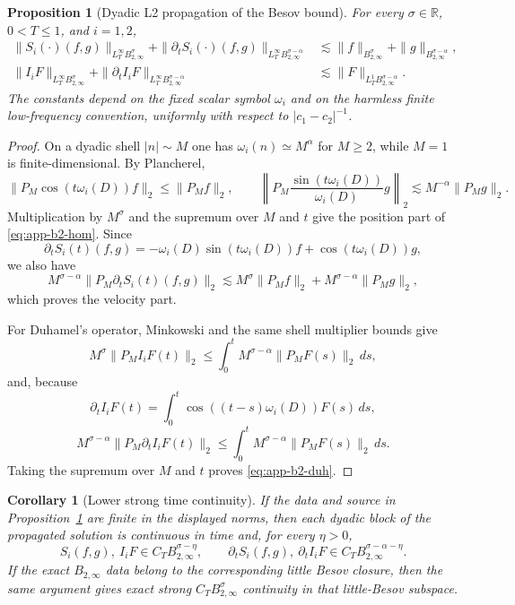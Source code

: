 \documentclass[10pt]{amsart}
\numberwithin{equation}{section}
\theoremstyle{plain}
\newtheorem{proposition}[theorem]{Proposition}
\newtheorem{corollary}[theorem]{Corollary}
\theoremstyle{definition}
\theoremstyle{remark}
\newcommand{\Btwo}{B_{2,\infty}}
\begin{document}
\begin{proposition}[Dyadic L2 propagation of the Besov bound]\label{prop:app-b2-propagation}
For every $\sigma\in\mathbb R$, $0<T\le1$, and $i=1,2$,
\begin{align}
 \|S_i(\cdot)(f,g)\|_{L_T^\infty\Btwo^\sigma}
 +\|\partial_tS_i(\cdot)(f,g)\|_{L_T^\infty\Btwo^{\sigma-\alpha}}
 &\lesssim
 \|f\|_{\Btwo^\sigma}+\|g\|_{\Btwo^{\sigma-\alpha}},
 \label{eq:app-b2-hom}\\
 \|I_iF\|_{L_T^\infty\Btwo^\sigma}
 +\|\partial_tI_iF\|_{L_T^\infty\Btwo^{\sigma-\alpha}}
 &\lesssim
 \|F\|_{L_T^1\Btwo^{\sigma-\alpha}}.
 \label{eq:app-b2-duh}
\end{align}
The constants depend on the fixed scalar symbol $\omega_i$ and on the harmless finite low-frequency convention, uniformly with respect to $|c_1-c_2|^{-1}$.
\end{proposition}

\begin{proof}
On a dyadic shell $|n|\sim M$ one has $\omega_i(n)\simeq M^\alpha$ for $M\ge2$, while $M=1$ is finite-dimensional.  By Plancherel,
\[
 \|P_M\cos(t\omega_i(D))f\|_{2}\le \|P_Mf\|_2,
 \qquad
 \left\|P_M\frac{\sin(t\omega_i(D))}{\omega_i(D)}g\right\|_2
 \lesssim M^{-\alpha}\|P_Mg\|_2.
\]
Multiplication by $M^\sigma$ and the supremum over $M$ and $t$ give the position part of \eqref{eq:app-b2-hom}.  Since
\[
\partial_tS_i(t)(f,g)=-\omega_i(D)\sin(t\omega_i(D))f+\cos(t\omega_i(D))g,
\]
we also have
\[
M^{\sigma-\alpha}\|P_M\partial_tS_i(t)(f,g)\|_2
\lesssim M^\sigma\|P_Mf\|_2+M^{\sigma-\alpha}\|P_Mg\|_2,
\]
which proves the velocity part.

For Duhamel's operator, Minkowski and the same shell multiplier bounds give
\[
M^\sigma\|P_MI_iF(t)\|_2
\le \int_0^t M^{\sigma-\alpha}\|P_MF(s)\|_2\,ds,
\]
and, because
\[
\partial_t I_iF(t)=\int_0^t\cos((t-s)\omega_i(D))F(s)\,ds,
\]
\[
M^{\sigma-\alpha}\|P_M\partial_tI_iF(t)\|_2
\le \int_0^t M^{\sigma-\alpha}\|P_MF(s)\|_2\,ds.
\]
Taking the supremum over $M$ and $t$ proves \eqref{eq:app-b2-duh}.
\end{proof}

\begin{corollary}[Lower strong time continuity]\label{cor:app-b2-lower-continuity}
If the data and source in Proposition~\ref{prop:app-b2-propagation} are finite in the displayed norms, then each dyadic block of the propagated solution is continuous in time and, for every $\eta>0$,
\[
S_i(f,g),\ I_iF\in C_T\Btwo^{\sigma-\eta},
\qquad
\partial_tS_i(f,g),\ \partial_tI_iF\in C_T\Btwo^{\sigma-\alpha-\eta}.
\]
If the exact $B_{2,\infty}$ data belong to the corresponding little Besov closure, then the same argument gives exact strong $C_T\Btwo^\sigma$ continuity in that little-Besov subspace.
\end{corollary}
\end{document}
